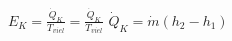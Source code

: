 \( E_K = \frac{\dot{Q}_K}{T_{viel}} = \frac{\dot{Q}_K}{T_{viel}} \)  
\( \dot{Q}_K = \dot{m} (h_2 - h_1) \)